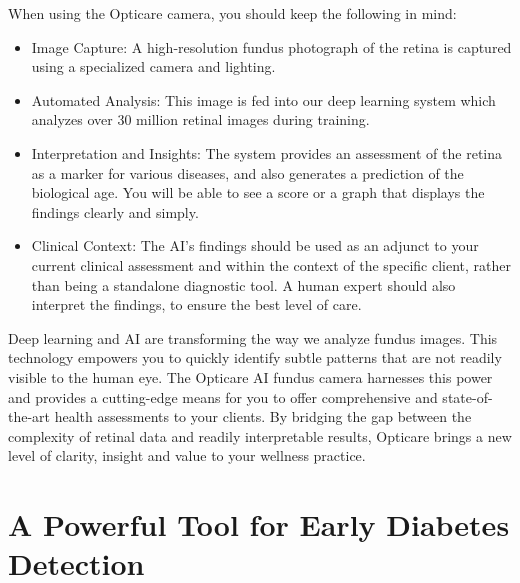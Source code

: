 \documentclass[
  Letterpaper,
]{scrbook}
\begin{document}
\begin{tcolorbox}[enhanced jigsaw, opacitybacktitle=0.6, rightrule=.15mm, colbacktitle=quarto-callout-note-color!10!white, toptitle=1mm, title=\textcolor{quarto-callout-note-color}{\faInfo}\hspace{0.5em}{Understanding the Process}, bottomtitle=1mm, breakable, colframe=quarto-callout-note-color-frame, bottomrule=.15mm, coltitle=black, leftrule=.75mm, titlerule=0mm, arc=.35mm, toprule=.15mm, left=2mm, opacityback=0, colback=white]

When using the Opticare camera, you should keep the following in mind:

\begin{itemize}
\item
  Image Capture: A high-resolution fundus photograph of the retina is
  captured using a specialized camera and lighting.
\item
  Automated Analysis: This image is fed into our deep learning system
  which analyzes over 30 million retinal images during training.
\item
  Interpretation and Insights: The system provides an assessment of the
  retina as a marker for various diseases, and also generates a
  prediction of the biological age. You will be able to see a score or a
  graph that displays the findings clearly and simply.
\item
  Clinical Context: The AI's findings should be used as an adjunct to
  your current clinical assessment and within the context of the
  specific client, rather than being a standalone diagnostic tool. A
  human expert should also interpret the findings, to ensure the best
  level of care.
\end{itemize}

\end{tcolorbox}

Deep learning and AI are transforming the way we analyze fundus images.
This technology empowers you to quickly identify subtle patterns that
are not readily visible to the human eye. The Opticare AI fundus camera
harnesses this power and provides a cutting-edge means for you to offer
comprehensive and state-of-the-art health assessments to your clients.
By bridging the gap between the complexity of retinal data and readily
interpretable results, Opticare brings a new level of clarity, insight
and value to your wellness practice.

\section{A Powerful Tool for Early Diabetes
Detection}\label{a-powerful-tool-for-early-diabetes-detection}
\end{document}
